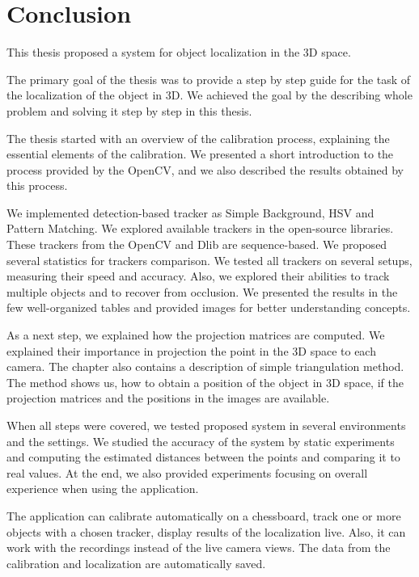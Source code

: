 \chapter*{Conclusion}

This thesis proposed a system for object localization in the 3D space.

The primary goal of the thesis was to provide a step by step guide for the task
of the localization of the object in 3D. We achieved the goal by the describing
whole problem and solving it step by step in this thesis.

The thesis started with an overview of the calibration process, explaining the
essential elements of the calibration. We presented a short introduction to the
process provided by the OpenCV, and we also described the results obtained by
this process.

We implemented detection-based tracker as Simple Background, HSV and Pattern
Matching. We explored available trackers in the open-source libraries. These
trackers from the OpenCV and Dlib are sequence-based. We proposed several
statistics for trackers comparison. We tested all trackers on several setups,
measuring their speed and accuracy. Also, we explored their abilities to track
multiple objects and to recover from occlusion. We presented the results in the
few well-organized tables and provided images for better understanding
concepts.

As a next step, we explained how the projection matrices are computed. We
explained their importance in projection the point in the 3D space to each
camera. The chapter also contains a description of simple triangulation method.
The method shows us, how to obtain a position of the object in 3D space, if the
projection matrices and the positions in the images are available.

When all steps were covered, we tested proposed system in several environments
and the settings. We studied the accuracy of the system by static experiments
and computing the estimated distances between the points and comparing it to
real values. At the end, we also provided experiments focusing on overall
experience when using the application.

The application can calibrate automatically on a chessboard, track one or more
objects with a chosen tracker, display results of the localization live. Also,
it can work with the recordings instead of the live camera views. The data from
the calibration and localization are automatically saved.

